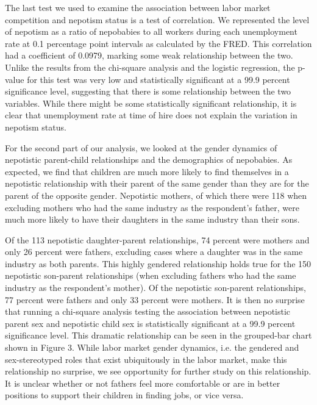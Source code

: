 \documentclass[12pt]{article}
\begin{document}
The last test we used to examine the association between labor market competition and nepotism status is a test of correlation. We represented the level of nepotism as a ratio of nepobabies to all workers during each unemployment rate at 0.1 percentage point intervals as calculated by the FRED. This correlation had a coefficient of 0.0979, marking some weak relationship between the two. Unlike the results from the chi-square analysis and the logistic regression, the p-value for this test was very low and statistically significant at a 99.9 percent significance level, suggesting that there is some relationship between the two variables. While there might be some statistically significant relationship, it is clear that unemployment rate at time of hire does not explain the variation in nepotism status.

For the second part of our analysis, we looked at the gender dynamics of nepotistic parent-child relationships and the demographics of nepobabies. As expected, we find that children are much more likely to find themselves in a nepotistic relationship with their parent of the same gender than they are for the parent of the opposite gender. Nepotistic mothers, of which there were 118 when excluding mothers who had the same industry as the respondent’s father, were much more likely to have their daughters in the same industry than their sons. 



Of the 113 nepotistic daughter-parent relationships, 74 percent were mothers and only 26 percent were fathers, excluding cases where a daughter was in the same industry as both parents. This highly gendered relationship holds true for the 150 nepotistic son-parent relationships (when excluding fathers who had the same industry as the respondent’s mother). Of the nepotistic son-parent relationships, 77 percent were fathers and only 33 percent were mothers. It is then no surprise that running a chi-square analysis testing the association between nepotistic parent sex and nepotistic child sex is statistically significant at a 99.9 percent significance level. This dramatic relationship can be seen in the grouped-bar chart shown in Figure 3. While labor market gender dynamics, i.e. the gendered and sex-stereotyped roles that exist ubiquitously in the labor market, make this relationship no surprise, we see opportunity for further study on this relationship. It is unclear whether or not fathers feel more comfortable or are in better positions to support their children in finding jobs, or vice versa.
\end{document}
